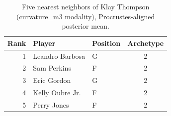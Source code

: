 \begin{table}[htbp]
  \centering\small
  \begin{tabular}{rllc}
    \toprule
    Rank & Player & Position & Archetype \\
    \midrule
    1 & Leandro Barbosa & G & 2 \\
    2 & Sam Perkins & F & 2 \\
    3 & Eric Gordon & G & 2 \\
    4 & Kelly Oubre Jr. & F & 2 \\
    5 & Perry Jones & F & 2 \\
    \bottomrule
  \end{tabular}
  \caption{Five nearest neighbors of Klay Thompson (curvature_m3 modality), Procrustes-aligned posterior mean.}
  \label{tab:Klay_Thompson_neighbors_curvature_m3}
\end{table}


